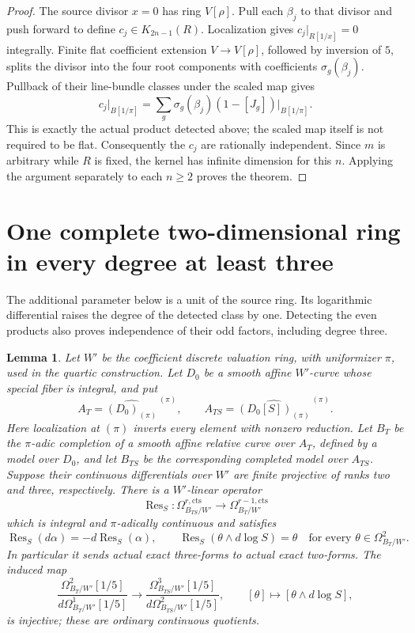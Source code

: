 \documentclass[11pt,a4paper]{amsart}
\numberwithin{equation}{section}
\newtheorem{lemma}[theorem]{Lemma}
\theoremstyle{definition}
\theoremstyle{remark}
\begin{document}
\begin{proof}
The source divisor $x=0$ has ring $V[\rho]$.
Pull each $\beta_j$ to that divisor and push forward to define
$c_j\in K_{2n-1}(R)$.  Localization gives $c_j|_{R[1/x]}=0$
integrally.  Finite flat coefficient extension $V\to V[\rho]$,
followed by inversion of $5$, splits the divisor into the four
root components with coefficients $\sigma_g(\beta_j)$.
Pullback of their line-bundle classes under the scaled map gives
\[
 c_j|_{B[1/\pi]}
   =\sum_g\sigma_g(\beta_j)(1-[J_g])\big|_{B[1/\pi]}.
\]
This is exactly the actual product detected above; the scaled map
itself is not required to be flat.
Consequently the $c_j$ are rationally independent.
Since $m$ is arbitrary while $R$ is fixed, the kernel has infinite
dimension for this $n$.  Applying the argument separately to each
$n\geq2$ proves the theorem.
\end{proof}

\section{One complete two-dimensional ring in every degree at least three}
\label{d2ext:dimtwoAllDegreesFixedRing}

The additional parameter below is a unit of the source ring.
Its logarithmic differential raises the degree of the detected
class by one.  Detecting the even products also proves independence
of their odd factors, including degree three.

\begin{lemma}
\label{d2ext:dimtwoFullCohenLaurentResidue}
Let $W'$ be the coefficient discrete valuation ring, with
uniformizer $\pi$, used in the quartic construction.  Let $D_0$
be a smooth affine $W'$-curve whose special fiber is integral,
and put
\[
 A_T=\widehat{(D_0)_{(\pi)}}^{\,(\pi)},\qquad
 A_{TS}=\widehat{(D_0[S])_{(\pi)}}^{\,(\pi)}.
\]
Here localization at $(\pi)$ inverts every element with nonzero
reduction.  Let $B_T$ be the $\pi$-adic completion of a smooth
affine relative curve over $A_T$, defined by a model over $D_0$,
and let $B_{TS}$ be the corresponding completed model over
$A_{TS}$.  Suppose their continuous differentials over $W'$
are finite projective of ranks two and three, respectively.
There is a $W'$-linear operator
\[
 \operatorname{Res}_S:
 \Omega^{r,\mathrm{cts}}_{B_{TS}/W'}
       \longrightarrow \Omega^{r-1,\mathrm{cts}}_{B_T/W'}
\]
which is integral and $\pi$-adically continuous and satisfies
\[
 \operatorname{Res}_S(d\alpha)=-d\operatorname{Res}_S(\alpha),
 \qquad
 \operatorname{Res}_S(\theta\wedge d\log S)=\theta
       \quad\text{for every }\theta\in\Omega^2_{B_T/W'}.
\]
In particular it sends actual exact three-forms to actual exact
two-forms. The induced map
\[
 \frac{\Omega^2_{B_T/W'}[1/5]}
      {d\Omega^1_{B_T/W'}[1/5]}
 \longrightarrow
 \frac{\Omega^3_{B_{TS}/W'}[1/5]}
      {d\Omega^2_{B_{TS}/W'}[1/5]},
 \qquad [\theta]\longmapsto[\theta\wedge d\log S],
\]
is injective; these are ordinary continuous quotients.
\end{lemma}
\end{document}
